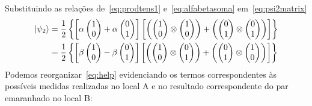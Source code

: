 Substituindo as relações de~\eqref{eq:prodtens1} e~\eqref{eq:alfabetasoma} em~\eqref{eq:psi2matrix}
\begin{equation}\label{eq:help}
  \begin{split}
\ket{\psi_2} &= \frac{1}{2}\left\{\left[\alpha\begin{pmatrix}
1 \\
0
\end{pmatrix}+\alpha\begin{pmatrix}
0 \\
1
\end{pmatrix}\right]\left[\left(\begin{pmatrix}
1 \\
0
\end{pmatrix} \otimes \begin{pmatrix}
1 \\
0
\end{pmatrix}\right) + \left(\begin{pmatrix}
0 \\
1
\end{pmatrix} \otimes \begin{pmatrix}
0 \\
1
\end{pmatrix}\right)\right]\right\} \nonumber \\
&= \frac{1}{2}\left\{\left[\beta\begin{pmatrix}
1 \\
0
\end{pmatrix}-\beta\begin{pmatrix}
0 \\
1
\end{pmatrix}\right]\left[\left(\begin{pmatrix}
1 \\
0
\end{pmatrix} \otimes \begin{pmatrix}
0 \\
1
\end{pmatrix}\right) + \left(\begin{pmatrix}
0 \\
1
\end{pmatrix} \otimes \begin{pmatrix}
1 \\
0
\end{pmatrix}\right)\right]\right\}
  \end{split}
\end{equation}
Podemos reorganizar~\eqref{eq:help} evidenciando os termos correspondentes às possíveis medidas realizadas no local A e no resultado correspondente do par emaranhado no local B:

